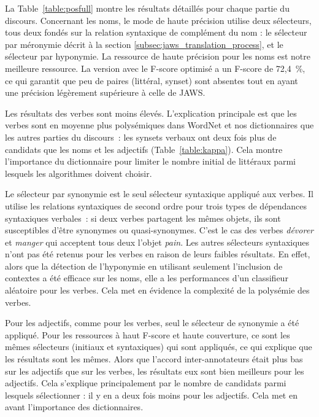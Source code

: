 La Table~\ref{table:posfull} montre les résultats détaillés pour chaque partie
du discours. Concernant les noms, le mode de haute précision utilise deux
sélecteurs, tous deux fondés sur la relation syntaxique de complément du nom :
le sélecteur par méronymie décrit à la section
\ref{subsec:jaws_translation_process}, et le sélecteur par hyponymie. La
ressource de haute précision pour les noms est notre meilleure ressource. La
version avec le F-score optimisé a un F-score de 72,4~\%, ce qui garantit que
peu de paires (littéral, synset) sont absentes tout en ayant une précision
légèrement supérieure à celle de JAWS.

Les résultats des verbes sont moins élevés. L'explication principale est que
les verbes sont en moyenne plus polysémiques dans WordNet et nos dictionnaires
que les autres parties du discours~: les synsets verbaux ont deux fois plus de
candidats que les noms et les adjectifs (Table~\ref{table:kappa}). Cela montre
l'importance du dictionnaire pour limiter le nombre initial de littéraux parmi
lesquels les algorithmes doivent choisir.

Le sélecteur par synonymie est le seul sélecteur syntaxique appliqué aux
verbes. Il utilise les relations syntaxiques de second ordre pour trois types
de dépendances syntaxiques verbales~: si deux verbes partagent les mêmes
objets, ils sont susceptibles d'être synonymes ou quasi-synonymes. C'est le cas
des verbes \textit{dévorer} et \textit {manger} qui acceptent tous deux l'objet
\textit{pain}. Les autres sélecteurs syntaxiques n'ont pas été retenus pour les
verbes en raison de leurs faibles résultats. En effet, alors que la détection
de l'hyponymie en utilisant seulement l'inclusion de contextes a été efficace
sur les noms, elle a les performances d'un classifieur aléatoire pour les
verbes. Cela met en évidence la complexité de la polysémie des verbes.

Pour les adjectifs, comme pour les verbes, seul le sélecteur de synonymie a été
appliqué. Pour les ressources à haut F-score et haute couverture, ce sont les
mêmes sélecteurs (initiaux et syntaxiques) qui sont appliqués, ce qui explique
que les résultats sont les mêmes. Alors que l'accord inter-annotateurs était
plus bas sur les adjectifs que sur les verbes, les résultats eux sont bien
meilleurs pour les adjectifs. Cela s'explique principalement par le nombre de
candidats parmi lesquels sélectionner : il y en a deux fois moins pour les
adjectifs. Cela met en avant l'importance des dictionnaires.

